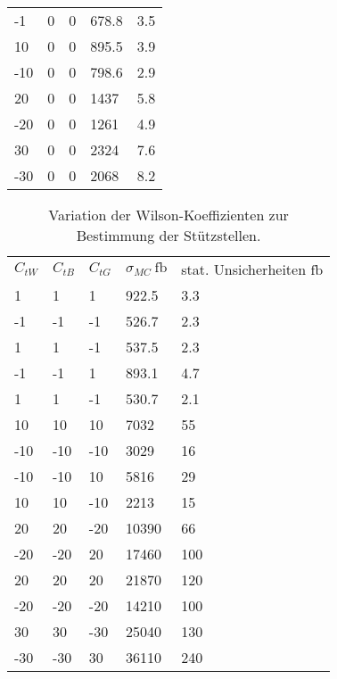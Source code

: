 \begin{table}
\begin{tabular}{lllll}
  -1   &     0      &     0      &      678.8   &    3.5\\
  10   &     0      &     0      &      895.5   &    3.9\\
  -10  &     0      &     0      &      798.6   &    2.9\\
  20   &     0      &     0      &      1437    &    5.8\\
  -20  &     0      &     0      &      1261    &    4.9\\
  30   &     0      &     0      &      2324    &    7.6\\
  -30   &    0      &     0      &      2068   &     8.2\\
  \bottomrule
\end{tabular}
\label{tab:lit1}
\end{table}
\begin{table}
  \centering
  \caption{Variation der Wilson-Koeffizienten zur Bestimmung der Stützstellen.}
  \begin{tabular}{lllll}
    \toprule
    $C_{tW}$ & $C_{tB}$ & $C_{tG}$ & $\sigma_{MC}~\si{\femto\barn}$ & stat. Unsicherheiten $\si{\femto\barn}$\\
  1     &    1      &     1      &      922.5  &     3.3\\
  -1    &    -1     &     -1     &      526.7  &     2.3\\
  1     &    1      &     -1     &      537.5  &     2.3\\
  -1    &     -1    &      1     &      893.1  &     4.7\\
  1     &     1     &      -1    &      530.7  &     2.1\\
  10    &    10     &     10     &      7032   &     55\\
  -10   &    -10    &     -10    &      3029   &     16\\
  -10   &     -10   &      10    &      5816   &     29\\
  10    &    10     &     -10    &      2213   &     15\\
  20    &    20     &     -20    &      10390  &     66\\
  -20   &    -20    &     20     &      17460  &     100\\
  20    &    20     &     20     &      21870  &     120\\
  -20   &    -20    &     -20    &      14210  &     100\\
  30    &    30     &     -30    &      25040  &     130\\
  -30   &    -30    &     30     &      36110  &     240\\

\end{tabular}
\end{table}
